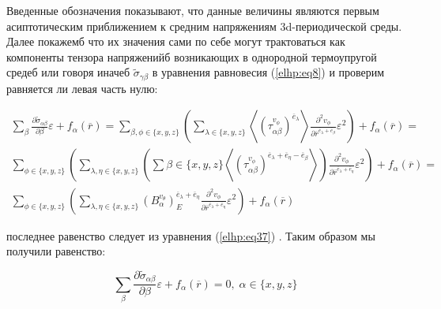 Введенные обозначения показывают, что данные величины являются первым асиптотическим
приближением к средним напряжениям 3d-периодической среды. Далее
покажемб что их значения сами по себе могут трактоваться как компоненты тензора
напряженийб возникающих в однородной термоупругой средеб или говоря иначеб 
$ \widetilde{\sigma}_{\gamma\beta}$
в 
уравнения равновесия 
(\ref{elhp:eq8})
и проверим равняется ли левая часть нулю:

\begin{equation}
    \label{elhp:eq56}
    \begin{gathered}
        \sum_{\beta} \frac{ \partial \widetilde{\sigma}_{ \alpha\beta}} { \partial \beta}
            \varepsilon + f_{\alpha} \left( \overline{r}  \right) =
            \sum_{ \beta,\phi \in \{x,y,z\} }
    \left( 
        \sum_{ \lambda \in \{x,y,z\} }
        \left< 
        \left( \tau_{\alpha\beta}^{v_{\phi}} \right)^{ \overline{e}_{\lambda}} 
        \right> 
        \frac{ \partial^2 v_{\phi}}
        { \partial \overline{r}^{ \overline{e}_{\lambda} + \overline{e}_{\beta}} } \varepsilon^2
    \right) 
    + f_{\alpha} \left( \overline{r}  \right)
    = \\
            \sum_{\phi \in \{x,y,z\} }
    \left( 
        \sum_{ \lambda, \eta \in \{x,y,z\} }
        \left( 
            \sum{ \beta \in \{x,y,z\} }
        \left< 
        \left( \tau_{\alpha\beta}^{v_{\phi}} \right)^{\overline{e}_{\lambda} + \overline{e}_{\eta} - \overline{e}_{\beta}} 
        \right> 
        \right) 
        \frac{ \partial^2 v_{\phi}}
        { \partial \overline{r}^{ \overline{e}_{\lambda} + \overline{e}_{\eta}} } \varepsilon^2
    \right) 
    + f_{\alpha} \left( \overline{r}  \right)
    = \\
            \sum_{\phi \in \{x,y,z\} }
    \left( 
        \sum_{ \lambda, \eta \in \{x,y,z\} }
        \left( B_{\alpha}^{ v_{\theta}} \right)_E^{ \overline{e}_{\lambda} + \overline{e}_{\eta}} 
        \frac{ \partial^2 v_{\phi}}
        { \partial \overline{r}^{ \overline{e}_{\lambda} + \overline{e}_{\eta}} } \varepsilon^2
    \right) 
    + f_{\alpha} \left( \overline{r}  \right)
    \end{gathered}
\end{equation}

последнее равенство следует из уравнения 
(\ref{elhp:eq37})
.
Таким образом мы получили равенство:

\begin{equation}
    \label{elhp:eq57}
        \sum_{\beta} \frac{ \partial \widetilde{\sigma}_{ \alpha\beta}} { \partial \beta}
            \varepsilon + f_{\alpha} \left( \overline{r}  \right) = 0
            , \; \alpha \in \{x,y,z\}
\end{equation}

